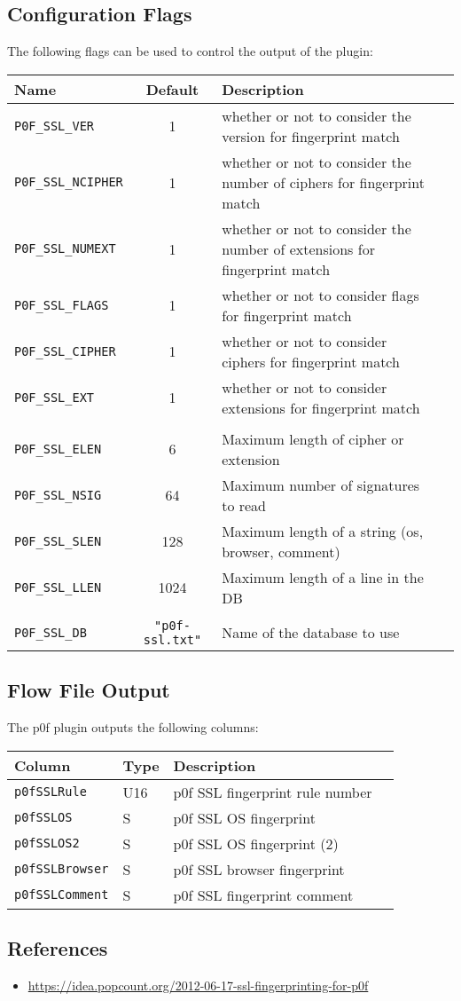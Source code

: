 \documentclass[documentation]{subfiles}
\begin{document}
\subsection{Configuration Flags}
The following flags can be used to control the output of the plugin:
\begin{longtable}{lcll}
    \toprule
    {\bf Name} & {\bf Default} & {\bf Description}\\
    \midrule\endhead%
    {\tt P0F\_SSL\_VER}     & 1 & whether or not to consider the version for fingerprint match\\
    {\tt P0F\_SSL\_NCIPHER} & 1 & whether or not to consider the number of ciphers for fingerprint match\\
    {\tt P0F\_SSL\_NUMEXT}  & 1 & whether or not to consider the number of extensions for fingerprint match\\
    {\tt P0F\_SSL\_FLAGS}   & 1 & whether or not to consider flags for fingerprint match\\
    {\tt P0F\_SSL\_CIPHER}  & 1 & whether or not to consider ciphers for fingerprint match\\
    {\tt P0F\_SSL\_EXT}     & 1 & whether or not to consider extensions for fingerprint match\\\\
    {\tt P0F\_SSL\_ELEN}    &    6 & Maximum length of cipher or extension\\
    {\tt P0F\_SSL\_NSIG}    &   64 & Maximum number of signatures to read\\
    {\tt P0F\_SSL\_SLEN}    &  128 & Maximum length of a string (os, browser, comment)\\
    {\tt P0F\_SSL\_LLEN}    & 1024 & Maximum length of a line in the DB\\\\
    {\tt P0F\_SSL\_DB} & {\tt "p0f-ssl.txt"} & Name of the database to use\\
    \bottomrule
\end{longtable}

\subsection{Flow File Output}
The p0f plugin outputs the following columns:
\begin{longtable}{llll}
    \toprule
    {\bf Column} & {\bf Type} & {\bf Description}\\
    \midrule\endhead%
    {\tt p0fSSLRule}    & U16 & p0f SSL fingerprint rule number\\
    {\tt p0fSSLOS}      &   S & p0f SSL OS fingerprint\\
    {\tt p0fSSLOS2}     &   S & p0f SSL OS fingerprint (2)\\
    {\tt p0fSSLBrowser} &   S & p0f SSL browser fingerprint\\
    {\tt p0fSSLComment} &   S & p0f SSL fingerprint comment\\
    \bottomrule
\end{longtable}

\subsection{References}
\begin{itemize}
    \item \url{https://idea.popcount.org/2012-06-17-ssl-fingerprinting-for-p0f}
\end{itemize}
\end{document}
